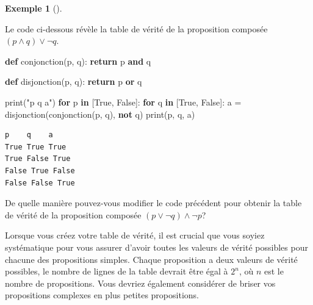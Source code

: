\documentclass[
  letterpaper,
]{scrbook}
\newenvironment{Shaded}{\begin{snugshade}}{\end{snugshade}}
\newcommand{\BuiltInTok}[1]{\textcolor[rgb]{0.00,0.50,0.00}{#1}}
\newcommand{\ControlFlowTok}[1]{\textcolor[rgb]{0.00,0.44,0.13}{\textbf{#1}}}
\newcommand{\KeywordTok}[1]{\textcolor[rgb]{0.00,0.44,0.13}{\textbf{#1}}}
\newcommand{\NormalTok}[1]{\textcolor[rgb]{0.00,0.44,0.13}{#1}}
\newcommand{\OperatorTok}[1]{\textcolor[rgb]{0.40,0.40,0.40}{#1}}
\newcommand{\StringTok}[1]{\textcolor[rgb]{0.25,0.44,0.63}{#1}}
\newcommand{\VariableTok}[1]{\textcolor[rgb]{0.10,0.09,0.49}{#1}}
\theoremstyle{plain}
\theoremstyle{definition}
\theoremstyle{definition}
\newtheorem{example}{Exemple}[chapter]
\theoremstyle{remark}
\begin{document}
\begin{example}[]\protect\hypertarget{exm-proposition-compose}{}\label{exm-proposition-compose}

Le code ci-dessous révèle la table de vérité de la proposition composée
\((p \wedge q) \vee \lnot q\).

\hypertarget{prop-composee-1}{}
\begin{Shaded}
\begin{Highlighting}[]
\KeywordTok{def}\NormalTok{ conjonction(p, q):}
    \ControlFlowTok{return}\NormalTok{ p }\KeywordTok{and}\NormalTok{ q}

\KeywordTok{def}\NormalTok{ disjonction(p, q):}
    \ControlFlowTok{return}\NormalTok{ p }\KeywordTok{or}\NormalTok{ q}

\BuiltInTok{print}\NormalTok{(}\StringTok{"p    q    a"}\NormalTok{)}
\ControlFlowTok{for}\NormalTok{ p }\KeywordTok{in}\NormalTok{ [}\VariableTok{True}\NormalTok{, }\VariableTok{False}\NormalTok{]:}
    \ControlFlowTok{for}\NormalTok{ q }\KeywordTok{in}\NormalTok{ [}\VariableTok{True}\NormalTok{, }\VariableTok{False}\NormalTok{]:}
\NormalTok{        a }\OperatorTok{=}\NormalTok{ disjonction(conjonction(p, q), }\KeywordTok{not}\NormalTok{ q)}
        \BuiltInTok{print}\NormalTok{(p, q, a)}
\end{Highlighting}
\end{Shaded}

\begin{verbatim}
p    q    a
True True True
True False True
False True False
False False True
\end{verbatim}

De quelle manière pouvez-vous modifier le code précédent pour obtenir la
table de vérité de la proposition composée
\((p \vee \lnot q) \wedge \lnot p\)?

\end{example}

Lorsque vous créez votre table de vérité, il est crucial que vous soyiez
systématique pour vous assurer d'avoir toutes les valeurs de vérité
possibles pour chacune des propositions simples. Chaque proposition a
deux valeurs de vérité possibles, le nombre de lignes de la table
devrait être égal à \(2^n\), où \(n\) est le nombre de propositions.
Vous devriez également considérer de briser vos propositions complexes
en plus petites propositions.
\end{document}
